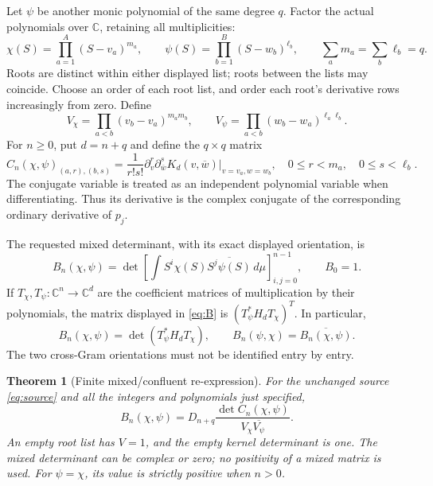 \documentclass[11pt]{article}
\newtheorem{theorem}{Theorem}
\newcommand{\C}{\mathbb C}
\begin{document}
Let \(\psi\) be another monic polynomial of the same degree \(q\).
Factor the actual polynomials over \(\C\), retaining all multiplicities:
\[
 \chi(S)=\prod_{a=1}^{A}(S-v_a)^{m_a},\qquad
 \psi(S)=\prod_{b=1}^{B}(S-w_b)^{\ell_b},\qquad
 \sum_a m_a=\sum_b\ell_b=q.
\]
Roots are distinct within either displayed list; roots between the lists
may coincide. Choose an order of each root list, and order each root's
derivative rows increasingly from zero. Define
\begin{equation}\label{eq:V}
 V_\chi=\prod_{a<b}(v_b-v_a)^{m_am_b},\qquad
 V_\psi=\prod_{a<b}(w_b-w_a)^{\ell_a\ell_b}.
\end{equation}
For \(n\geq0\), put \(d=n+q\) and define the \(q\times q\) matrix
\begin{equation}\label{eq:C}
 C_n(\chi,\psi)_{(a,r),(b,s)}
  =\frac{1}{r!s!}
     \partial_v^r\partial_{\overline w}^{s}
           K_d(v,\overline w)\big|_{v=v_a,w=w_b},
 \quad 0\leq r<m_a,\quad0\leq s<\ell_b.
\end{equation}
The conjugate variable is treated as an independent polynomial variable
when differentiating. Thus its derivative is the complex conjugate of
the corresponding ordinary derivative of \(p_j\).

The requested mixed determinant, with its exact displayed orientation,
is
\begin{equation}\label{eq:B}
 B_n(\chi,\psi)=
 \det\left[\int S^i\chi(S)\overline{S^j\psi(S)}\,d\mu\right]_{i,j=0}^{n-1},
 \qquad B_0=1.
\end{equation}
If \(T_\chi,T_\psi:\C^n\to\C^d\) are the coefficient matrices of
multiplication by their polynomials, the matrix displayed in
\eqref{eq:B} is \((T_\psi^*H_dT_\chi)^T\). In particular,
\begin{equation}\label{eq:B-orientation}
 B_n(\chi,\psi)=\det(T_\psi^*H_dT_\chi),\qquad
 B_n(\psi,\chi)=\overline{B_n(\chi,\psi)}.
\end{equation}
The two cross-Gram orientations must not be identified entry by entry.

\begin{theorem}[Finite mixed/confluent re-expression]\label{thm:mixed}
For the unchanged source \eqref{eq:source} and all the integers and
polynomials just specified,
\begin{equation}\label{eq:main}
 \boxed{B_n(\chi,\psi)
   =D_{n+q}\frac{\det C_n(\chi,\psi)}{V_\chi\overline{V_\psi}}.}
\end{equation}
An empty root list has \(V=1\), and the empty kernel determinant is one.
The mixed determinant can be complex or zero; no positivity of a mixed
matrix is used. For \(\psi=\chi\), its value is strictly positive when
\(n>0\).
\end{theorem}
\end{document}
